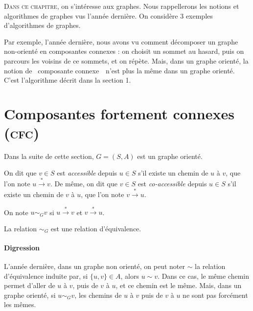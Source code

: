 \lettrine{D}{ans ce chapitre}, on s'intéresse aux graphes. Nous rappellerons les notions et algorithmes de graphes vus l'année dernière.
On considère 3 exemples d'algorithmes de graphes.

Par exemple, l'année dernière, nous avons vu comment décomposer un graphe non-orienté en composantes connexes : on choisit un sommet au hasard, puis on parcours les voisins de ce sommets, et on répète.
Mais, dans un graphe orienté, la notion de \guillemotleft~composante connexe~\guillemotright\ n'est plus la même dans un graphe orienté. C'est l'algorithme décrit dans la section 1.

\section{Composantes fortement connexes (\textsc{cfc})}

Dans la suite de cette section, $G = (S, A)$\/ est un graphe orienté.

\begin{defn}
	On dit que $v \in S$\/ est \textit{accessible} depuis $u \in S$\/ s'il existe un chemin de $u$\/ à $v$, que l'on note $u \xrightarrow{*} v$.
	De même, on dit que $v \in S$\/ est \textit{co-accessible} depuis $u \in S$\/ s'il existe un chemin de $v$\/ à $u$, que l'on note $v \xrightarrow{*} u$.
\end{defn}

\begin{defn}[$u \sim_G v$]
	On note $u \sim_G v$\/ si $u \xrightarrow{*} v$\/ et $v \xrightarrow{*} u$.
\end{defn}

\begin{rmk}
	La relation $\sim_G$\/ est une relation d'équivalence.
\end{rmk}

\paragraph{Digression}
L'année dernière, dans un graphe non orienté, on peut noter $\sim$\/ la relation d'équivalence induite par, si $\{u,v\} \in A$, alors $u \sim v$. Dans ce cas, le même chemin permet d'aller de $u$\/ à $v$, puis de $v$\/ à $u$, et ce chemin est le même. Mais, dans un graphe orienté, si $u \sim_G v$, les chemins de $u$\/ à $v$\/ puis de $v$\/ à $u$\/ ne sont pas forcément les mêmes.

